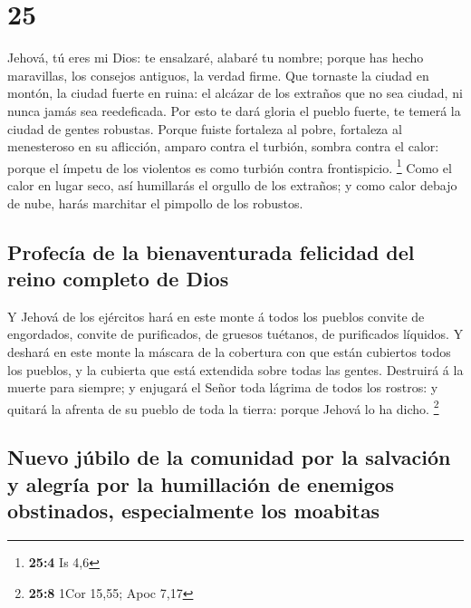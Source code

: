 \hypertarget{section-24}{%
\section{25}\label{section-24}}

 Jehová, tú eres mi Dios: te ensalzaré, alabaré tu nombre;
porque has hecho maravillas, los consejos antiguos, la verdad firme.
 Que tornaste la ciudad en montón, la ciudad fuerte en
ruina: el alcázar de los extraños que no sea ciudad, ni nunca jamás sea
reedeficada.  Por esto te dará gloria el pueblo fuerte, te
temerá la ciudad de gentes robustas.  Porque fuiste
fortaleza al pobre, fortaleza al menesteroso en su aflicción, amparo
contra el turbión, sombra contra el calor: porque el ímpetu de los
violentos es como turbión contra frontispicio. \footnote{\textbf{25:4}
  Is 4,6}  Como el calor en lugar seco, así humillarás el
orgullo de los extraños; y como calor debajo de nube, harás marchitar el
pimpollo de los robustos.

\hypertarget{profecuxeda-de-la-bienaventurada-felicidad-del-reino-completo-de-dios}{%
\subsection{Profecía de la bienaventurada felicidad del reino completo
de
Dios}\label{profecuxeda-de-la-bienaventurada-felicidad-del-reino-completo-de-dios}}

 Y Jehová de los ejércitos hará en este monte á todos los
pueblos convite de engordados, convite de purificados, de gruesos
tuétanos, de purificados líquidos.  Y deshará en este
monte la máscara de la cobertura con que están cubiertos todos los
pueblos, y la cubierta que está extendida sobre todas las gentes.
 Destruirá á la muerte para siempre; y enjugará el Señor
toda lágrima de todos los rostros: y quitará la afrenta de su pueblo de
toda la tierra: porque Jehová lo ha dicho. \footnote{\textbf{25:8} 1Cor
  15,55; Apoc 7,17}

\hypertarget{nuevo-juxfabilo-de-la-comunidad-por-la-salvaciuxf3n-y-alegruxeda-por-la-humillaciuxf3n-de-enemigos-obstinados-especialmente-los-moabitas}{%
\subsection{Nuevo júbilo de la comunidad por la salvación y alegría por
la humillación de enemigos obstinados, especialmente los
moabitas}\label{nuevo-juxfabilo-de-la-comunidad-por-la-salvaciuxf3n-y-alegruxeda-por-la-humillaciuxf3n-de-enemigos-obstinados-especialmente-los-moabitas}}

